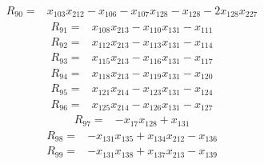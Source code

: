 \begin{equation*}\begin{split}
R_{90}={}&x_{103} x_{212} - x_{106} - x_{107} x_{128} - x_{128} - 2x_{128} x_{227}
\end{split}\end{equation*}
\begin{equation*}\begin{split}
R_{91}={}&x_{108} x_{213} - x_{110} x_{131} - x_{111}
\end{split}\end{equation*}
\begin{equation*}\begin{split}
R_{92}={}&x_{112} x_{213} - x_{113} x_{131} - x_{114}
\end{split}\end{equation*}
\begin{equation*}\begin{split}
R_{93}={}&x_{115} x_{213} - x_{116} x_{131} - x_{117}
\end{split}\end{equation*}
\begin{equation*}\begin{split}
R_{94}={}&x_{118} x_{213} - x_{119} x_{131} - x_{120}
\end{split}\end{equation*}
\begin{equation*}\begin{split}
R_{95}={}&x_{121} x_{214} - x_{123} x_{131} - x_{124}
\end{split}\end{equation*}
\begin{equation*}\begin{split}
R_{96}={}&x_{125} x_{214} - x_{126} x_{131} - x_{127}
\end{split}\end{equation*}
\begin{equation*}\begin{split}
R_{97}={}&-x_{17} x_{128} + x_{131}
\end{split}\end{equation*}
\begin{equation*}\begin{split}
R_{98}={}&-x_{131} x_{135} + x_{134} x_{212} - x_{136}
\end{split}\end{equation*}
\begin{equation*}\begin{split}
R_{99}={}&-x_{131} x_{138} + x_{137} x_{213} - x_{139}
\end{split}\end{equation*}
